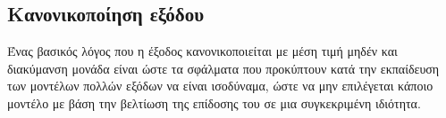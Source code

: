 \subsection{Κανονικοποίηση εξόδου}
Ένας βασικός λόγος που η έξοδος κανονικοποιείται με μέση τιμή μηδέν και διακύμανση μονάδα είναι ώστε τα σφάλματα που προκύπτουν κατά την εκπαίδευση των μοντέλων πολλών εξόδων να είναι ισοδύναμα, ώστε να μην επιλέγεται κάποιο μοντέλο με βάση την βελτίωση της επίδοσης του σε μια συγκεκριμένη ιδιότητα.